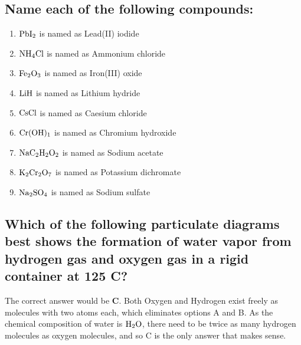 \documentclass[11pt]{article}
\begin{document}
\subsection{Name each of the following compounds:}
\label{sec:org66137d1}
\begin{enumerate}
\item \(\ce{PbI2}\) is named as Lead(II) iodide
\item \(\ce{NH4Cl}\) is named as Ammonium chloride
\item \(\ce{Fe2O3}\) is named as Iron(III) oxide
\item \(\ce{LiH}\) is named as Lithium hydride
\item \(\ce{CsCl}\) is named as Caesium chloride
\item \(\ce{Cr(OH)1}\) is named as Chromium hydroxide
\item \(\ce{NaC2H2O2}\) is named as Sodium acetate
\item \(\ce{K2Cr2O7}\) is named as Potassium dichromate
\item \(\ce{Na2SO4}\) is named as Sodium sulfate
\end{enumerate}

\subsection{Which of the following particulate diagrams best shows the formation of water vapor from hydrogen gas and oxygen gas in a rigid container at 125\textdegree{} C?}
\label{sec:org7e5f371}
The correct answer would be \textbf{C}. Both Oxygen and Hydrogen exist freely as molecules with two atoms each, which eliminates options A and B. As the chemical composition of water is \(\ce{H2O}\), there need to be twice as many hydrogen molecules as oxygen molecules, and so C is the only answer that makes sense.
\end{document}
